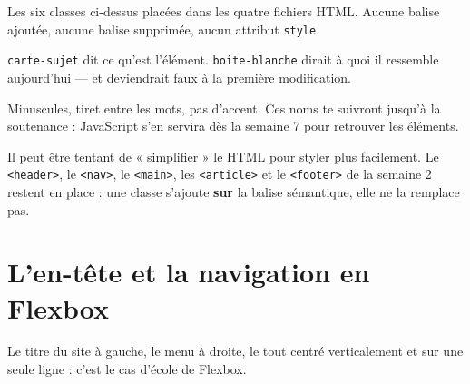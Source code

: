 \documentclass[a4paper,11pt]{article}
\begin{document}
\begin{tcolorbox}[definition, title={À produire}]
Les six classes ci-dessus placées dans les quatre fichiers HTML. Aucune balise ajoutée, aucune balise supprimée, aucun attribut \texttt{style}.
\end{tcolorbox}

\begin{tcolorbox}[attention, title={Nommer par le rôle, pas par l'apparence}]
\texttt{carte-sujet} dit ce qu'est l'élément. \texttt{boite-blanche} dirait à quoi il ressemble aujourd'hui --- et deviendrait faux à la première modification.

\vspace{3pt}
Minuscules, tiret entre les mots, pas d'accent. Ces noms te suivront jusqu'à la soutenance : JavaScript s'en servira dès la semaine 7 pour retrouver les éléments.
\end{tcolorbox}

\begin{tcolorbox}[interdit, title={Ne remplace pas tes balises sémantiques par des \texttt{<div>}}]
Il peut être tentant de « simplifier » le HTML pour styler plus facilement. Le \texttt{<header>}, le \texttt{<nav>}, le \texttt{<main>}, les \texttt{<article>} et le \texttt{<footer>} de la semaine 2 restent en place : une classe s'ajoute \textbf{sur} la balise sémantique, elle ne la remplace pas.
\end{tcolorbox}

\newpage

\section{L'en-tête et la navigation en Flexbox}

Le titre du site à gauche, le menu à droite, le tout centré verticalement et sur une seule ligne : c'est le cas d'école de Flexbox.
\end{document}
